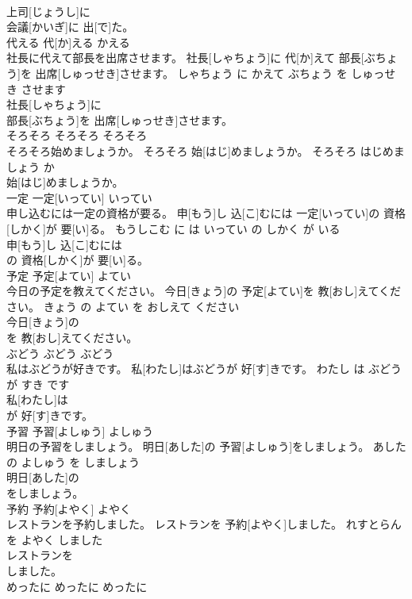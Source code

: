 \documentclass[8pt]{extreport}
\begin{document}
\begin{CJK}{UTF8}{min}
\\	上司[じょうし]に
\\	会議[かいぎ]に 出[で]た。			
\\	代える	代[か]える	かえる	
\\	社長に代えて部長を出席させます。	社長[しゃちょう]に 代[か]えて 部長[ぶちょう]を 出席[しゅっせき]させます。	しゃちょう に かえて ぶちょう を しゅっせき させます	
\\	社長[しゃちょう]に
\\	部長[ぶちょう]を 出席[しゅっせき]させます。			
\\	そろそろ	そろそろ	そろそろ	
\\	そろそろ始めましょうか。	そろそろ 始[はじ]めましょうか。	そろそろ はじめましょう か	
\\	始[はじ]めましょうか。			
\\	一定	一定[いってい]	いってい	
\\	申し込むには一定の資格が要る。	申[もう]し 込[こ]むには 一定[いってい]の 資格[しかく]が 要[い]る。	もうしこむ に は いってい の しかく が いる	
\\	申[もう]し 込[こ]むには
\\	の 資格[しかく]が 要[い]る。			
\\	予定	予定[よてい]	よてい	
\\	今日の予定を教えてください。	今日[きょう]の 予定[よてい]を 教[おし]えてください。	きょう の よてい を おしえて ください	
\\	今日[きょう]の
\\	を 教[おし]えてください。			
\\	ぶどう	ぶどう	ぶどう	
\\	私はぶどうが好きです。	私[わたし]はぶどうが 好[す]きです。	わたし は ぶどう が すき です	
\\	私[わたし]は
\\	が 好[す]きです。			
\\	予習	予習[よしゅう]	よしゅう	
\\	明日の予習をしましょう。	明日[あした]の 予習[よしゅう]をしましょう。	あした の よしゅう を しましょう	
\\	明日[あした]の
\\	をしましょう。			
\\	予約	予約[よやく]	よやく	
\\	レストランを予約しました。	レストランを 予約[よやく]しました。	れすとらん を よやく しました	
\\	レストランを
\\	しました。			
\\	めったに	めったに	めったに	

\end{CJK}
\end{document}
